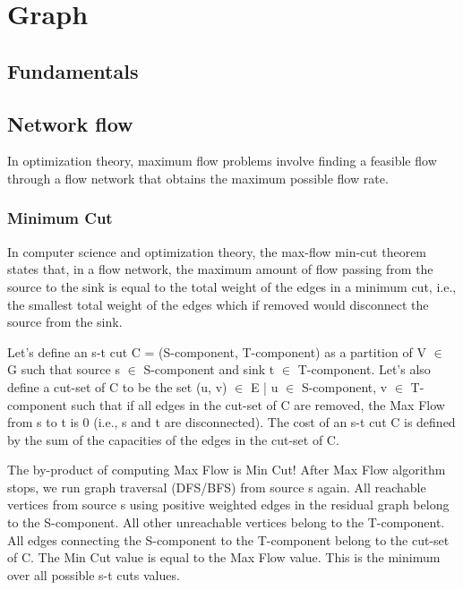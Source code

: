 \chapter{Graph}

\section{Fundamentals}



\section{Network flow}

	In optimization theory, maximum flow problems involve finding a 
	feasible flow through a flow network that obtains the maximum possible flow rate. 

	

	\subsection{Minimum Cut}

In computer science and optimization theory, the max-flow min-cut theorem states that, in a flow network, 
the maximum amount of flow passing from the source to the sink is equal to the total weight of the edges 
in a minimum cut, i.e., the smallest total weight of the edges which if removed would disconnect the source from the sink. 

Let's define an s-t cut C = (S-component, T-component) as a partition of V $\in$ G such that 
source s $\in$ S-component and sink t $\in$ T-component. Let's also define a cut-set of C to be the set 
(u, v) $\in$ E | u $\in$ S-component, v $\in$ T-component such that if all edges in the cut-set of C are removed,
the Max Flow from s to t is 0 (i.e., s and t are disconnected). The cost of an s-t cut C is defined by the sum
of the capacities of the edges in the cut-set of C.

The by-product of computing Max Flow is Min Cut! After Max Flow algorithm stops, we run graph traversal (DFS/BFS)
from source s again. All reachable vertices from source s using positive weighted edges in the residual graph belong
to the S-component. All other unreachable vertices belong to the T-component. All edges connecting the S-component to
the T-component belong to the cut-set of C. The Min Cut value is equal to the Max Flow value.
This is the minimum over all possible s-t cuts values.

